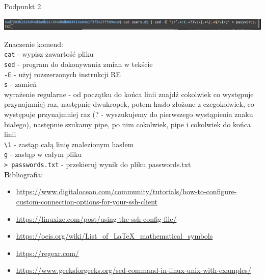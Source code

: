 \documentclass[a4paper]{article}
\begin{document}
\noindent Podpunkt 2

\begin{center}
    \includegraphics[scale=0.4]{zadanie2.png}
\end{center}

\noindent Znaczenie komend: \\
\noindent \verb+cat+ - wypisz zawartość pliku \\
\noindent \verb+sed+ - program do dokonywania zmian w tekście \\
\noindent \verb+-E+ - użyj rozszerzonych instrukcji RE \\
\noindent \verb+s+ - zamień \\
\noindent wyrażenie regularne - od początku do końca linii znajdź cokolwiek co występuje przynajmniej raz, następnie dwukropek, potem hasło złożone z czegokolwiek, co występuje przynajmniej raz (? - wyszukujemy do pierwszego wystąpienia znaku białego), następnie szukamy pipe, po nim cokolwiek, pipe i cokolwiek do końca linii \\
\noindent \verb+\1+ - zastąp całą linię znalezionym hasłem \\
\noindent \verb+g+ - zastąp w całym pliku \\
\noindent \verb+> passwords.txt+ - przekieruj wynik do pliku passwords.txt \\

\newpage
\textbf Bibliografia:
\begin{itemize}
    \item \url{https://www.digitalocean.com/community/tutorials/how-to-configure-custom-connection-options-for-your-ssh-client}
    \item \url{https://linuxize.com/post/using-the-ssh-config-file/}
    \item \url{https://oeis.org/wiki/List_of_LaTeX_mathematical_symbols}
    \item \url{https://regexr.com/}
    \item \url{https://www.geeksforgeeks.org/sed-command-in-linux-unix-with-examples/}

\end{itemize}
\end{document}
